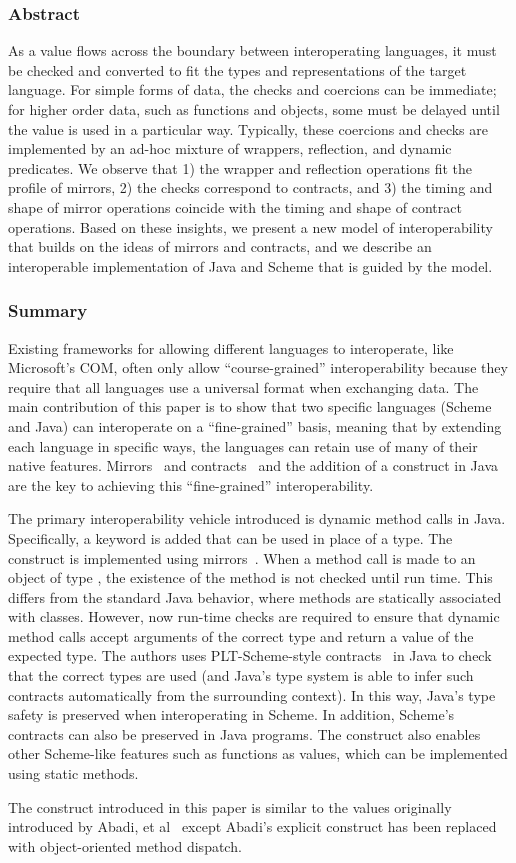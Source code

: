 \documentclass[12pt]{article}	%
\begin{document}
\subsubsection*{Abstract}
As a value flows across the boundary between interoperating languages, it must be checked and converted to fit the types and representations of the target language. For simple forms of data, the checks and coercions can be immediate; for higher order data, such as functions and objects, some must be delayed until the value is used in a particular way. Typically, these coercions and checks are implemented by an ad-hoc mixture of wrappers, reflection, and dynamic predicates. We observe that 1) the wrapper and reflection operations fit the profile of mirrors, 2) the checks correspond to contracts, and 3) the timing and shape of mirror operations coincide with the timing and shape of contract operations. Based on these insights, we present a new model of interoperability that builds on the ideas of mirrors and contracts, and we describe an interoperable implementation of Java and Scheme that is guided by the model.

\subsubsection*{Summary}
Existing frameworks for allowing different languages to interoperate, like Microsoft's COM, often only allow ``course-grained'' interoperability because they require that all languages use a universal format when exchanging data. The main contribution of this paper is to show that two specific languages (Scheme and Java) can interoperate on a ``fine-grained'' basis, meaning that by extending each language in specific ways, the languages can retain use of many of their native features. Mirrors~\cite{Bracha2004Mirrors} and contracts~\cite{Findler2002Contracts} and the addition of a \dynamic construct in Java are the key to achieving this ``fine-grained'' interoperability.

The primary interoperability vehicle introduced is dynamic method calls in Java. Specifically, a \dynamic keyword is added that can be used in place of a type. The \dynamic construct is implemented using mirrors~\cite{Bracha2004Mirrors}. When a method call is made to an object of type \dynamic, the existence of the method is not checked until run time. This differs from the standard Java behavior, where methods are statically associated with classes. However, now run-time checks are required to ensure that dynamic method calls accept arguments of the correct type and return a value of the expected type. The authors uses PLT-Scheme-style contracts~\cite{Findler2002Contracts} in Java to check that the correct types are used (and Java's type system is able to infer such contracts automatically from the surrounding context). In this way, Java's type safety is preserved when interoperating in Scheme. In addition, Scheme's contracts can also be preserved in Java programs. The \dynamic construct also enables other Scheme-like features such as functions as values, which can be implemented using \dynamic static methods.

The \dynamic construct introduced in this paper is similar to the \Dynamic values originally introduced by Abadi, et al~\cite{Abadi1991Dynamic} except Abadi's explicit \typecase construct has been replaced with object-oriented method dispatch.




\end{document}
